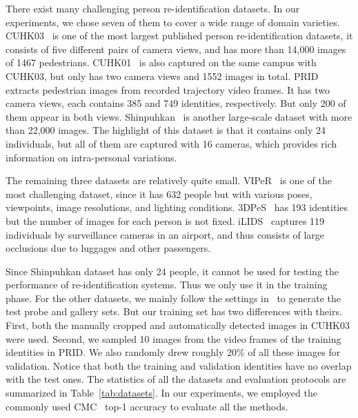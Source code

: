 There exist many challenging person re-identification datasets. In our experiments, we chose seven of them to cover a wide range of domain varieties. CUHK03~\cite{li2014deepreid} is one of the most largest published person re-identification datasets, it consists of five different pairs of camera views, and has more than 14,000 images of 1467 pedestrians. CUHK01~\cite{li2013locally} is also captured on the same campus with CUHK03, but only has two camera views and 1552 images in total. PRID~\cite{hirzer11a} extracts pedestrian images from recorded trajectory video frames. It has two camera views, each contains 385 and 749 identities, respectively. But only 200 of them appear in both views. Shinpuhkan~\cite{kawanishi2014shinpuhkan2014} is another large-scale dataset with more than 22,000 images. The highlight of this dataset is that it contains only 24 individuals, but all of them are captured with 16 cameras, which provides rich information on intra-personal variations.

The remaining three datasets are relatively quite small. VIPeR~\cite{gray2007evaluating} is one of the most challenging dataset, since it has 632 people but with various poses, viewpoints, image resolutions, and lighting conditions. 3DPeS~\cite{baltieri20113dpes} has 193 identities but the number of images for each person is not fixed. iLIDS~\cite{zheng2009associating} captures 119 individuals by surveillance cameras in an airport, and thus consists of large occlusions due to luggages and other passengers.

Since Shinpuhkan dataset has only 24 people, it cannot be used for testing the performance of re-identification systems. Thus we only use it in the training phase. For the other datasets, we mainly follow the settings in~\cite{paisitkriangkrai2015learning} to generate the test probe and gallery sets. But our training set has two differences with theirs. First, both the manually cropped and automatically detected images in CUHK03 were used. Second, we sampled 10 images from the video frames of the training identities in PRID. We also randomly drew roughly 20\% of all these images for validation. Notice that both the training and validation identities have no overlap with the test ones. The statistics of all the datasets and evaluation protocols are summarized in Table~\ref{tab:datasets}. In our experiments, we employed the commonly used CMC~\cite{moon2001computational} top-1 accuracy to evaluate all the methods.

